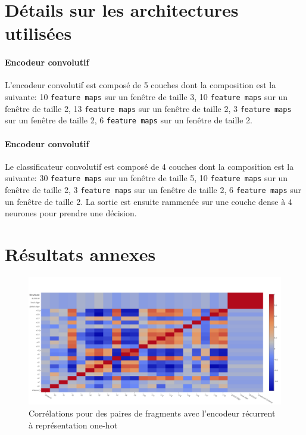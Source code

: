 \documentclass[a4paper, 11pt, onecolumn]{article}
\begin{document}
\newpage

\appendix

\printbibliography

\newpage

\section{Détails sur les architectures utilisées}

\paragraph{Encodeur convolutif} L'encodeur convolutif est composé de 5 couches
dont la composition est la suivante: 10 \texttt{feature maps} sur un fenêtre de
taille 3, 10 \texttt{feature maps} sur un fenêtre de
taille 2, 13 \texttt{feature maps} sur un fenêtre de
taille 2, 3 \texttt{feature maps} sur un fenêtre de
taille 2, 6 \texttt{feature maps} sur un fenêtre de
taille 2.

\paragraph{Encodeur convolutif} Le classificateur convolutif est composé de 4 couches
dont la composition est la suivante: 30 \texttt{feature maps} sur un fenêtre de
taille 5, 10 \texttt{feature maps} sur un fenêtre de
taille 2, 3 \texttt{feature maps} sur un fenêtre de
taille 2, 6 \texttt{feature maps} sur un fenêtre de
taille 2. La sortie est ensuite rammenée sur une couche dense à 4 neurones pour
prendre une décision.

\section{Résultats annexes}

\begin{figure}[H]
  \centering  
  \includegraphics[width=1\textwidth]{PairOneRecHeat}
  \caption{Corrélations pour des paires de fragments avec l'encodeur récurrent
    à représentation one-hot}
\end{figure}
\end{document}
